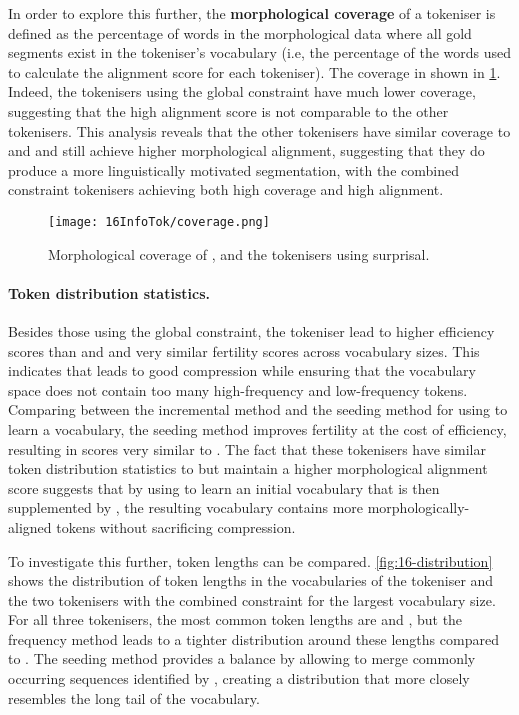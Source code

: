 In order to explore this further, the \textbf{morphological coverage} of a tokeniser is defined as the percentage of words in the morphological data where all gold segments exist in the tokeniser's vocabulary (i.e, the percentage of the words used to calculate the alignment score for each tokeniser). The coverage in shown in \cref{fig:16-coverage}. Indeed, the tokenisers using the global constraint have much lower coverage, suggesting that the high alignment score is not comparable to the other tokenisers. This analysis reveals that the other \tokname tokenisers have similar coverage to \bpe and \bpewp and still achieve higher morphological alignment, suggesting that they do produce a more linguistically motivated segmentation, with the combined constraint tokenisers achieving both high coverage and high alignment. 

\begin{figure}[!t]
    \centering
    \texttt{[image: 16InfoTok/coverage.png]}
    \caption{Morphological coverage of \bpe, \bpewp and the \tokname tokenisers using surprisal.}
    \label{fig:16-coverage}
\end{figure}

\paragraph{Token distribution statistics.}

Besides those using the global constraint, the \tokname tokeniser lead to higher \renyi efficiency scores than \bpe and \bpewp and very similar fertility scores across vocabulary sizes. This indicates that \tokname leads to good compression while ensuring that the vocabulary space does not contain too many high-frequency and low-frequency tokens. Comparing between the incremental method and the seeding method for using \tokname to learn a vocabulary, the seeding method improves fertility at the cost of \renyi efficiency, resulting in scores very similar to \bpewp. The fact that these tokenisers have similar token distribution statistics to \bpewp but maintain a higher morphological alignment score suggests that by using \tokname to learn an initial vocabulary that is then supplemented by \bpe, the resulting vocabulary contains more morphologically-aligned tokens without sacrificing compression.

To investigate this further, token lengths can be compared. \cref{fig:16-distribution} shows the distribution of token lengths in the vocabularies of the \bpewp tokeniser and the two \tokname tokenisers with the combined constraint for the largest vocabulary size. For all three tokenisers, the most common token lengths are  and , but the frequency method leads to a tighter distribution around these lengths compared to \bpewp. The seeding method provides a balance by allowing \bpe to merge commonly occurring sequences identified by \tokname, creating a distribution that more closely resembles the long tail of the \bpewp vocabulary.

